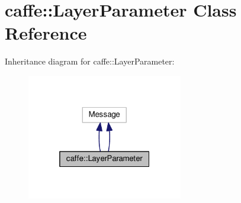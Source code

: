 \hypertarget{classcaffe_1_1_layer_parameter}{}\section{caffe\+:\+:Layer\+Parameter Class Reference}
\label{classcaffe_1_1_layer_parameter}


Inheritance diagram for caffe\+:\+:Layer\+Parameter\+:
\nopagebreak
\begin{figure}[H]
\begin{center}
\leavevmode
\includegraphics[width=193pt]{classcaffe_1_1_layer_parameter__inherit__graph}
\end{center}
\end{figure}
